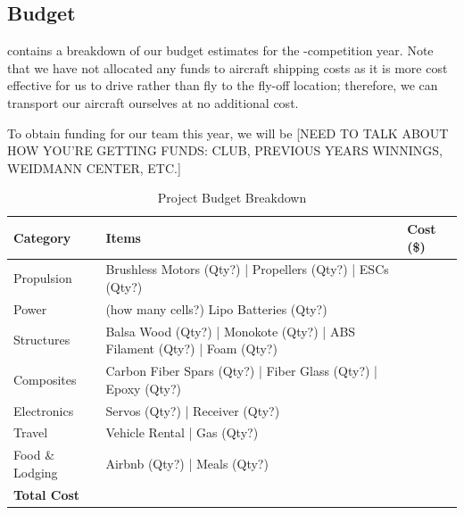\documentclass[proposal]{byu-aero}
\begin{document}
\subsection{Budget}
\label{ssec:Budget}

 contains a breakdown of our budget estimates for the \the\year-\NextYear competition year. Note that we have not allocated any funds to aircraft shipping costs as it is more cost effective for us to drive rather than fly to the fly-off location; therefore, we can transport our aircraft ourselves at no additional cost. %

To obtain funding for our team this year, we will be {\color{BYUred}[NEED TO TALK ABOUT HOW YOU'RE GETTING FUNDS: CLUB, PREVIOUS YEARS WINNINGS, WEIDMANN CENTER, ETC.]} %
\lipsum[2]

\begin{table}[htb!]
	\centering
	\renewcommand{\arraystretch}{1.2}
	\caption{Project Budget Breakdown}
	\label{tab:budget}
	\begin{tabular}{ |l|l|l| } 
		\hline
		\rowcolor{BYUbluemid}
		Category & Items & Cost (\$) \\ 
		\hline
		Propulsion &  Brushless Motors (Qty?) | Propellers (Qty?) | ESCs (Qty?) &  \\
		\hline
		Power & (how many cells?) Lipo Batteries (Qty?) & \\ 
		\hline
		Structures & Balsa Wood (Qty?) | Monokote (Qty?) | ABS Filament (Qty?) | Foam (Qty?) & \\ 
		\hline
		Composites & Carbon Fiber Spars (Qty?) | Fiber Glass (Qty?) | Epoxy (Qty?) &  \\ 
		\hline
		Electronics & Servos (Qty?) | Receiver (Qty?) &  \\
		\hline
		Travel & Vehicle Rental | Gas (Qty?) &  \\
		\hline
		Food \& Lodging & Airbnb (Qty?) | Meals (Qty?) &  \\
		\hline 
		\textbf{Total Cost} & & \textbf{} \\ 
		\hline
		
	\end{tabular}
\end{table}
\end{document}
